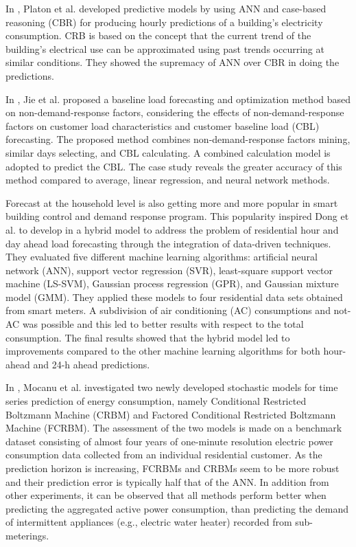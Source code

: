 In \cite{PLATON201510}, Platon et al. developed predictive models by using ANN and case-based reasoning (CBR) for producing hourly predictions of a building’s electricity consumption.
CRB is based on the concept that the current trend of the building's electrical use can be approximated using past trends occurring at similar conditions.
They showed the supremacy of ANN over CBR in doing the predictions.

In \cite{7576207}, Jie et al. proposed a baseline load forecasting and optimization method based on non-demand-response factors, considering the effects of non-demand-response factors on customer load characteristics and customer baseline load (CBL) forecasting.
The proposed method combines non-demand-response factors mining, similar days selecting, and CBL calculating.
A combined calculation model is adopted to predict the CBL.
The case study reveals the greater accuracy of this method compared to average, linear regression, and neural network methods.

Forecast at the household level is also getting more and more popular in smart building control and demand response program.
This popularity inspired Dong et al. to develop in \cite{DONG2016341} a hybrid model to address the problem of residential hour and day ahead load forecasting through the integration of data-driven techniques.
They evaluated five different machine learning algorithms: artificial neural network (ANN), support vector regression (SVR), least-square support vector machine (LS-SVM), Gaussian process regression (GPR), and Gaussian mixture model (GMM).
They applied these models to four residential data sets obtained from smart meters.
A subdivision of air conditioning (AC) consumptions and not-AC was possible and this led to better results with respect to the total consumption.
The final results showed that the hybrid model led to improvements compared to the other machine learning algorithms for both hour-ahead and 24-h ahead predictions.

In \cite{MOCANU201691}, Mocanu et al. investigated two newly developed stochastic models for time series prediction of energy consumption, namely Conditional Restricted Boltzmann Machine (CRBM) and Factored Conditional Restricted Boltzmann Machine (FCRBM).
The assessment of the two models is made on a benchmark dataset consisting of almost four years of one-minute resolution electric power consumption data collected from an individual residential customer.
As the prediction horizon is increasing, FCRBMs and CRBMs seem to be more robust and their prediction error is typically half that of the ANN.
In addition from other experiments, it can be observed that all methods perform better when predicting the aggregated active power consumption, than predicting the demand of intermittent appliances (e.g., electric water heater) recorded from sub-meterings.

